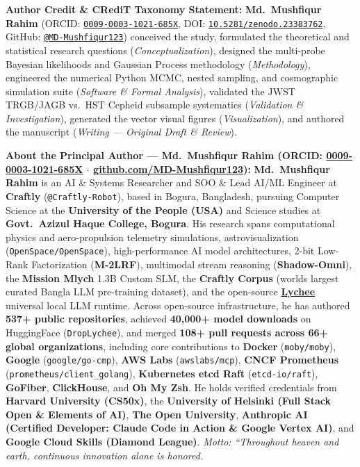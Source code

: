 \documentclass[aps,prd,preprint,superscriptaddress,nofootinbib]{revtex4-2}
\newcommand{\takeaway}[2]{\vspace{6pt}\noindent\colorbox{boxbg}{\parbox{\dimexpr\textwidth-2\fboxsep\relax}{\vspace{5pt}\textbf{\color{primary}#1:}\hspace{0.4em}#2\vspace{5pt}}}\vspace{6pt}}
\begin{document}
\noindent\textbf{Author Credit \& CRediT Taxonomy Statement:} \textbf{Md.\ Mushfiqur Rahim} (ORCID: \href{https://orcid.org/0009-0003-1021-685X}{\texttt{0009-0003-1021-685X}}, DOI: \href{https://doi.org/10.5281/zenodo.23383762}{\texttt{10.5281/zenodo.23383762}}, GitHub: \href{https://github.com/MD-Mushfiqur123}{\texttt{@MD-Mushfiqur123}}) conceived the study, formulated the theoretical and statistical research questions (\emph{Conceptualization}), designed the multi-probe Bayesian likelihoods and Gaussian Process methodology (\emph{Methodology}), engineered the numerical Python MCMC, nested sampling, and cosmographic simulation suite (\emph{Software \& Formal Analysis}), validated the JWST TRGB/JAGB vs.\ HST Cepheid subsample systematics (\emph{Validation \& Investigation}), generated the vector visual figures (\emph{Visualization}), and authored the manuscript (\emph{Writing --- Original Draft \& Review}).

\takeaway{About the Principal Author --- Md.\ Mushfiqur Rahim (ORCID: \href{https://orcid.org/0009-0003-1021-685X}{0009-0003-1021-685X} $\cdot$ \href{https://github.com/MD-Mushfiqur123}{github.com/MD-Mushfiqur123})}{%
\textbf{Md.\ Mushfiqur Rahim} is an AI \& Systems Researcher and SOO \& Lead AI/ML Engineer at \textbf{Craftly} (\texttt{@Craftly-Robot}), based in Bogura, Bangladesh, pursuing Computer Science at the \textbf{University of the People (USA)} and Science studies at \textbf{Govt.\ Azizul Haque College, Bogura}. His research spans computational physics and aero-propulsion telemetry simulations, astrovisualization (\texttt{OpenSpace/OpenSpace}), high-performance AI model architectures, 2-bit Low-Rank Factorization (\textbf{M-2LRF}), multimodal stream reasoning (\textbf{Shadow-Omni}), the \textbf{Mission Mlych} 1.3B Custom SLM, the \textbf{Craftly Corpus} (world\textquotesingle s largest curated Bangla LLM pre-training dataset), and the open-source \href{https://github.com/MD-Mushfiqur123/lychee}{\textbf{Lychee}} universal local LLM runtime. Across open-source infrastructure, he has authored \textbf{537+ public repositories}, achieved \textbf{40,000+ model downloads} on HuggingFace (\texttt{DropLychee}), and merged \textbf{108+ pull requests across 66+ global organizations}, including core contributions to \textbf{Docker} (\texttt{moby/moby}), \textbf{Google} (\texttt{google/go-cmp}), \textbf{AWS Labs} (\texttt{awslabs/mcp}), \textbf{CNCF Prometheus} (\texttt{prometheus/client\_golang}), \textbf{Kubernetes etcd Raft} (\texttt{etcd-io/raft}), \textbf{GoFiber}, \textbf{ClickHouse}, and \textbf{Oh My Zsh}. He holds verified credentials from \textbf{Harvard University (CS50x)}, the \textbf{University of Helsinki (Full Stack Open \& Elements of AI)}, \textbf{The Open University}, \textbf{Anthropic AI (Certified Developer: Claude Code in Action \& Google Vertex AI)}, and \textbf{Google Cloud Skills (Diamond League)}. \emph{Motto: ``Throughout heaven and earth, continuous innovation alone is honored.}
}
\end{document}
